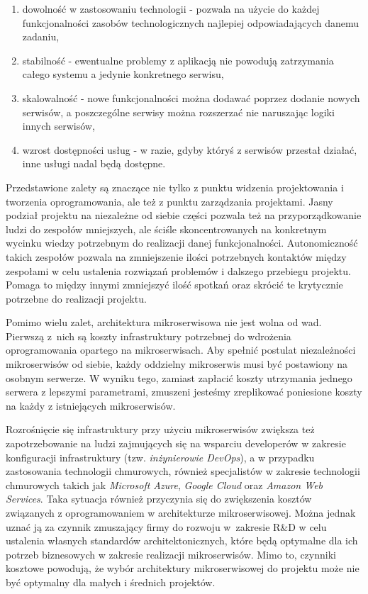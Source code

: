 \documentclass{SGGW-thesis}
\begin{document}
  \begin{enumerate}
    \item dowolność w zastosowaniu technologii - pozwala na użycie do każdej funkcjonalności zasobów technologicznych najlepiej odpowiadających danemu zadaniu,
    \item stabilność - ewentualne problemy z aplikacją nie powodują zatrzymania całego systemu a jedynie konkretnego serwisu,
    \item skalowalność - nowe funkcjonalności można dodawać poprzez dodanie nowych serwisów, a poszczególne serwisy można rozszerzać nie naruszając logiki innych serwisów,
    \item wzrost dostępności usług - w razie, gdyby któryś z serwisów przestał działać, inne usługi nadal będą dostępne.
  \end{enumerate}

  Przedstawione zalety są znaczące nie tylko z punktu widzenia projektowania i tworzenia oprogramowania, ale też z punktu zarządzania projektami. Jasny podział projektu na niezależne od siebie części pozwala też na przyporządkowanie ludzi do zespołów mniejszych, ale ściśle skoncentrowanych na konkretnym wycinku wiedzy potrzebnym do realizacji danej funkcjonalności. 
  Autonomiczność takich zespołów pozwala na zmniejszenie ilości potrzebnych kontaktów między zespołami w celu ustalenia rozwiązań problemów i dalszego przebiegu projektu. Pomaga to między innymi zmniejszyć ilość spotkań oraz skrócić te krytycznie potrzebne do realizacji projektu.
  
  Pomimo wielu zalet, architektura mikroserwisowa nie jest wolna od wad. Pierwszą z~nich są koszty infrastruktury potrzebnej do wdrożenia oprogramowania opartego na mikroserwisach. Aby spełnić postulat niezależności mikroserwisów od siebie, każdy oddzielny mikroserwis musi być postawiony na osobnym serwerze. W wyniku tego, zamiast zapłacić koszty utrzymania jednego serwera z lepszymi parametrami, zmuszeni jesteśmy zreplikować poniesione koszty na każdy z istniejących mikroserwisów. 
  
  Rozrośnięcie się infrastruktury przy użyciu mikroserwisów zwiększa też zapotrzebowanie na ludzi zajmujących się na wsparciu developerów w zakresie konfiguracji infrastruktury (tzw. \textit{inżynierowie DevOps}), a w przypadku zastosowania technologii chmurowych, również specjalistów w zakresie technologii chmurowych takich jak \textit{Microsoft Azure}, \textit{Google Cloud} oraz \textit{Amazon Web Services}. Taka sytuacja również przyczynia się do zwiększenia kosztów związanych z oprogramowaniem w architekturze mikroserwisowej. Można jednak uznać ją za czynnik zmuszający firmy do rozwoju w~zakresie R\&D w celu ustalenia własnych standardów architektonicznych, które będą optymalne dla ich potrzeb biznesowych w zakresie realizacji mikroserwisów. Mimo to, czynniki kosztowe powodują, że wybór architektury mikroserwisowej do projektu może nie być optymalny dla małych i średnich projektów.
\end{document}
